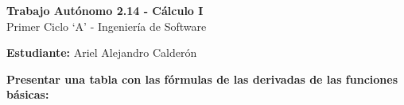 \documentclass[answers]{exam} %
\begin{document}
\begin{center}
    \large\textbf{Trabajo Autónomo 2.14 - Cálculo I}\\[1em]
    \large Primer Ciclo \enquote*{A} - Ingeniería de Software\\[1em]
\end{center}

\vspace{0.5cm}
\large\textbf{Estudiante:} Ariel Alejandro Calderón
\vspace{0.5cm}

\begin{questions}

    \question \large\textbf{Presentar una tabla con las fórmulas de las derivadas de las funciones básicas:}

    \begin{center}



\end{center}
\end{questions}
\end{document}
